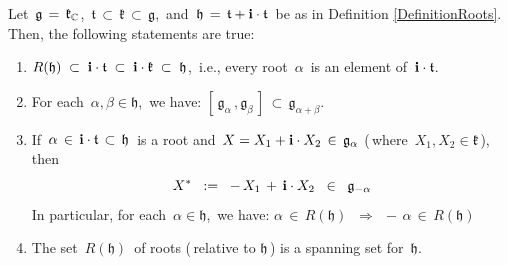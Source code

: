 \vskip 0.5cm
\begin{proposition}
\mbox{}
\vskip 0.05cm
\noindent
Let
\,$\mathfrak{g} \,=\, \mathfrak{k}_{\mathbb{C}}$,\,
$\mathfrak{t} \,\subset\, \mathfrak{k} \,\subset\, \mathfrak{g}$,\,
and
\,$\mathfrak{h} \,=\, \mathfrak{t} + \mathbf{i}\cdot\mathfrak{t}$\,
be as in Definition \ref{DefinitionRoots}.
Then, the following statements are true:
\begin{enumerate}
\item
    $R(\mathfrak{h}) \;\subset\; \mathbf{i}\cdot\mathfrak{t} \;\subset\; \mathbf{i}\cdot\mathfrak{k} \;\subset\; \mathfrak{h}$,\,
    i.e., every root \,$\alpha$\, is an element of \,$\mathbf{i}\cdot\mathfrak{t}$.\,
\item
    For each \,$\alpha, \beta \in \mathfrak{h}$,\, we have:
    \;$\left[\,\mathfrak{g}_{\alpha}\,,\mathfrak{g}_{\beta}\,\right]
    \, \subset \,
        \mathfrak{g}_{\alpha + \beta}
    $.\;
\item
    If
    \,$\alpha \,\in\, \mathbf{i}\cdot\mathfrak{t} \,\subset\, \mathfrak{h}$\,
    is a root and
    \,$X = X_{1} + \mathbf{i} \cdot X_{2} \,\in\, \mathfrak{g}_{\alpha}$
    (\,where \,$X_{1}, X_{2} \in \mathfrak{k}$\,),\,
    then
    \begin{equation*}
    X^{*} \;\; := \;\; -\,X_{1} \,+\, \mathbf{i} \cdot X_{2} \;\;\in\;\; \mathfrak{g}_{-\alpha}
    \end{equation*}
    In particular, for each \,$\alpha \in \mathfrak{h}$,\, we have:
    $\alpha \,\in\, R(\mathfrak{h}) \;\;\Longrightarrow\;\, -\,\alpha \,\in\, R(\mathfrak{h})$
\item
    The set \,$R(\mathfrak{h})$\, of roots (\,relative to $\mathfrak{h}$\,)
    is a spanning set for \,$\mathfrak{h}$.\,
\end{enumerate}
\end{proposition}
\proof
